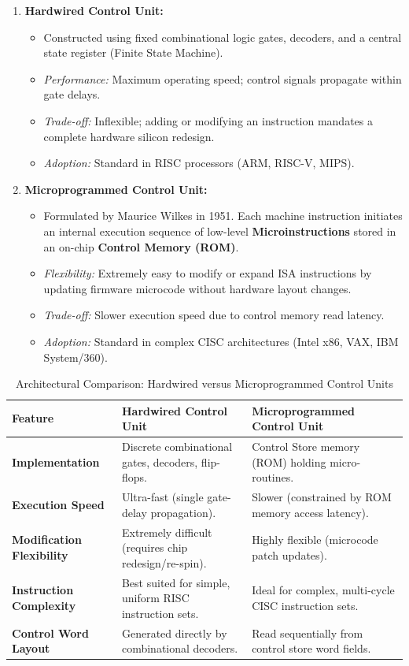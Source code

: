 \begin{enumerate}[label=\bfseries\arabic*.]
    \item \textbf{Hardwired Control Unit:}
    \begin{itemize}
        \item Constructed using fixed combinational logic gates, decoders, and a central state register (Finite State Machine).
        \item \textit{Performance:} Maximum operating speed; control signals propagate within gate delays.
        \item \textit{Trade-off:} Inflexible; adding or modifying an instruction mandates a complete hardware silicon redesign.
        \item \textit{Adoption:} Standard in RISC processors (ARM, RISC-V, MIPS).
    \end{itemize}
    \item \textbf{Microprogrammed Control Unit:}
    \begin{itemize}
        \item Formulated by Maurice Wilkes in 1951. Each machine instruction initiates an internal execution sequence of low-level \textbf{Microinstructions} stored in an on-chip \textbf{Control Memory (ROM)}.
        \item \textit{Flexibility:} Extremely easy to modify or expand ISA instructions by updating firmware microcode without hardware layout changes.
        \item \textit{Trade-off:} Slower execution speed due to control memory read latency.
        \item \textit{Adoption:} Standard in complex CISC architectures (Intel x86, VAX, IBM System/360).
    \end{itemize}
\end{enumerate}

\begin{table}[htbp]
\centering
\small
\caption{Architectural Comparison: Hardwired versus Microprogrammed Control Units}
\label{tab:hardwired_vs_microprogrammed}
\begin{tabularx}{\textwidth}{l X X}
\toprule
\textbf{Feature} & \textbf{Hardwired Control Unit} & \textbf{Microprogrammed Control Unit} \\
\midrule
\textbf{Implementation} & Discrete combinational gates, decoders, flip-flops. & Control Store memory (ROM) holding micro-routines. \\
\textbf{Execution Speed} & Ultra-fast (single gate-delay propagation). & Slower (constrained by ROM memory access latency). \\
\textbf{Modification Flexibility} & Extremely difficult (requires chip redesign/re-spin). & Highly flexible (microcode patch updates). \\
\textbf{Instruction Complexity} & Best suited for simple, uniform RISC instruction sets. & Ideal for complex, multi-cycle CISC instruction sets. \\
\textbf{Control Word Layout} & Generated directly by combinational decoders. & Read sequentially from control store word fields. \\
\bottomrule
\end{tabularx}
\end{table}


